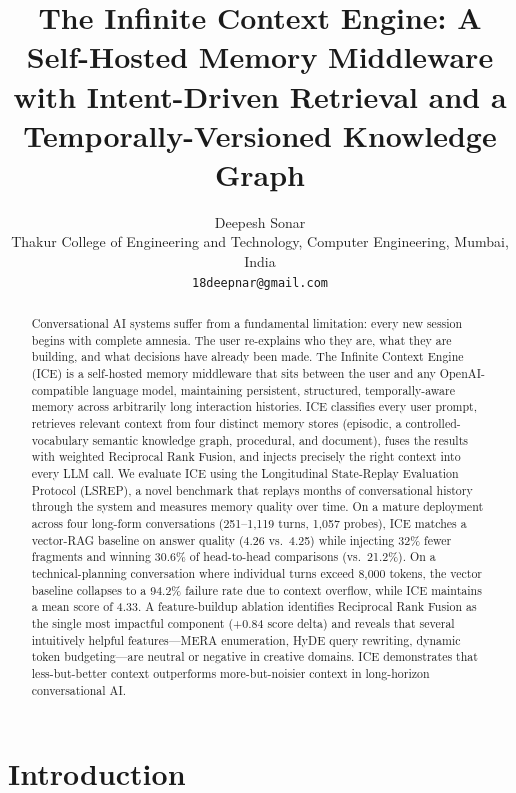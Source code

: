 \documentclass[11pt,a4paper]{article}
\title{\bfseries The Infinite Context Engine: A Self-Hosted Memory Middleware with Intent-Driven Retrieval and a Temporally-Versioned Knowledge Graph}
\author{Deepesh Sonar\\[2pt]
  \normalsize Thakur College of Engineering and Technology, Computer Engineering, Mumbai, India\\
  \normalsize\texttt{18deepnar@gmail.com}}
\date{}
\begin{document}
\maketitle
\thispagestyle{empty}

\begin{abstract}
Conversational AI systems suffer from a fundamental limitation: every new session begins with complete amnesia. The user re-explains who they are, what they are building, and what decisions have already been made. The Infinite Context Engine (ICE) is a self-hosted memory middleware that sits between the user and any OpenAI-compatible language model, maintaining persistent, structured, temporally-aware memory across arbitrarily long interaction histories. ICE classifies every user prompt, retrieves relevant context from four distinct memory stores (episodic, a controlled-vocabulary semantic knowledge graph, procedural, and document), fuses the results with weighted Reciprocal Rank Fusion, and injects precisely the right context into every LLM call. We evaluate ICE using the Longitudinal State-Replay Evaluation Protocol (LSREP), a novel benchmark that replays months of conversational history through the system and measures memory quality over time. On a mature deployment across four long-form conversations (251--1{,}119 turns, 1{,}057 probes), ICE matches a vector-RAG baseline on answer quality (4.26 vs.\ 4.25) while injecting 32\% fewer fragments and winning 30.6\% of head-to-head comparisons (vs.\ 21.2\%). On a technical-planning conversation where individual turns exceed 8{,}000 tokens, the vector baseline collapses to a 94.2\% failure rate due to context overflow, while ICE maintains a mean score of 4.33. A feature-buildup ablation identifies Reciprocal Rank Fusion as the single most impactful component (+0.84 score delta) and reveals that several intuitively helpful features---MERA enumeration, HyDE query rewriting, dynamic token budgeting---are neutral or negative in creative domains. ICE demonstrates that less-but-better context outperforms more-but-noisier context in long-horizon conversational AI.
\end{abstract}

\section{Introduction}
\end{document}
